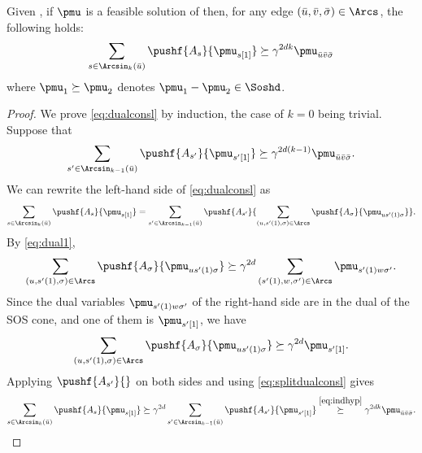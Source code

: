 \documentclass[11pt,twoside,a4paper,openright]{uclouvain-thesis}
\begin{document}
\begin{mylem}
  \label{lem:dualconsl}
  Given , %
  if $\pmu$ is a feasible solution of  then,
  for any edge $(\bar{u},\bar{v},\bar{\sigma}) \in \Arcs$,
  the following holds:
  \begin{equation}
    \label{eq:dualconsl}
    \sum_{s \in \Arcsin_k(\bar{u})} \pushf{A_s}{\pmu_{s[1]}} \succeq \gamma^{2dk} \pmu_{\bar{u}\bar{v}\bar{\sigma}}
  \end{equation}
  where $\pmu_1 \succeq \pmu_2$ denotes $\pmu_1 - \pmu_2 \in \Soshd$.
  \begin{proof}
    We prove \eqref{eq:dualconsl} by induction, the case of $k=0$ being trivial.
    Suppose that
    \begin{equation}
      \label{eq:indhyp}
      \sum_{s' \in \Arcsin_{k-1}(\bar{u})}\pushf{A_{s'}}{\pmu_{s'[1]}} \succeq \gamma^{2d(k-1)} \pmu_{\bar{u}\bar{v}\bar{\sigma}}.
    \end{equation}
    We can rewrite the left-hand side of \eqref{eq:dualconsl} as
    \begin{equation}
      \label{eq:splitdualconsl}
      \sum_{s \in \Arcsin_k(\bar{u})} \pushf{A_s}{\pmu_{s[1]}} = \sum_{s' \in \Arcsin_{k-1}(\bar{u})} \pushf{A_{s'}}{\sum_{(u,s'(1),\sigma) \in \Arcs} \pushf{A_\sigma}{\pmu_{us'(1)\sigma}}}.
    \end{equation}
    By \eqref{eq:dual1},
    \[
      \sum_{(u,s'(1),\sigma) \in \Arcs} \pushf{A_{\sigma}}{\pmu_{us'(1)\sigma}}
      \succeq \gamma^{2d} \sum_{(s'(1),w,\sigma') \in \Arcs} \pmu_{s'(1)w\sigma'}.
    \]
    Since the dual variables $\pmu_{s'(1)w\sigma'}$ of the right-hand side are in the dual of the SOS cone,
    and one of them is $\pmu_{s'[1]}$, we have
    \[
      \sum_{(u,s'(1),\sigma) \in \Arcs} \pushf{A_{\sigma}}{\pmu_{us'(1)\sigma}}
      \succeq \gamma^{2d} \pmu_{s'[1]}.
    \]
    Applying $\pushf{A_{s'}}{}$ on both sides and using \eqref{eq:splitdualconsl} gives
    \[
      \sum_{s \in \Arcsin_k(\bar{u})} \pushf{A_s}{\pmu_{s[1]}} \succeq \gamma^{2d} \sum_{s' \in \Arcsin_{k-1}(\bar{u})}\pushf{A_{s'}}{\pmu_{s'[1]}} \stackrel{\eqref{eq:indhyp}}{\succeq} \gamma^{2dk} \pmu_{\bar{u}\bar{v}\bar{\sigma}}.
    \]
  \end{proof}
\end{mylem}
\end{document}
